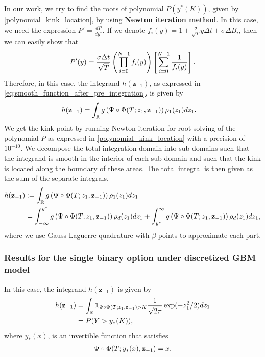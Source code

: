 In our work, we try to  find the roots of polynomial $P(y^{\ast}(K))$, given by \eqref{polynomial_kink_location}, by using \textbf{Newton iteration method}. In this case, we need the expression $P'=\frac{d P}{d y^\ast}$. If we denote $f_i(y)=1+\frac{\sigma}{\sqrt{T}} y \Delta t+ \sigma \Delta B_{i}$, then we can easily show that
\begin{align}\label{polynomial_kink_location_derivative}
	P'(y)=\frac{\sigma \Delta t}{\sqrt{T}} \left( \prod_{i=0}^{N-1} f_i(y)\right) \left[ \sum_{i=0}^{N-1} \frac{1}{f_i(y)}\right].
\end{align}
Therefore, in this case, the integrand $h(\mathbf{z}_{-1})$, as expressed in \eqref{eq:smooth_function_after_pre_integration}, is given by
\begin{align}\label{smoothed_integrand_single_opt_1d}
	h(\mathbf{z}_{-1})&= \int_{\mathbb{R}}  g   \left( \Psi \circ \Phi(T;z_1,\mathbf{z}_{-1})\right)   \rho_1(z_1) dz_1.
\end{align}
We get the kink point by running Newton iteration  for root solving of the polynomial $P$ as expressed in \eqref{polynomial_kink_location} with a precision of $10^{-10}$. We  decompose the total integration domain   into sub-domains such that the integrand is smooth in the interior of each sub-domain  and such that the kink is located along the boundary of these areas. The total integral is then given as the sum of the separate integrals, \ie
\begin{align}
	h(\mathbf{z}_{-1}) &:=  \int_{\mathbb{R}} g \left(\Psi \circ \Phi(T;z_1,\mathbf{z}_{-1})\right)   \rho_1(z_1) dz_1 \nonumber\\
	&=\int_{-\infty}^{y^\ast} g \left( \Psi \circ \Phi(T;z_1,\mathbf{z}_{-1})\right)  \rho_d(z_1) dz_1 +\int_{y^\ast}^{\infty} g \left( \Psi \circ \Phi(T;z_1,\mathbf{z}_{-1})\right) \rho_d(z_1) dz_1,
\end{align}
where we use Gauss-Laguerre quadrature with $\beta$ points to approximate each part.

\subsubsection{Results for the single binary option under discretized GBM model}\label{sec:Results for the binary option example}

In this case, the integrand $h(\mathbf{z}_{-1})$ is given by
\begin{align}\label{smoothed_integrand_binary_opt_2}
	h(\mathbf{z}_{-1})&= \int_{\mathbb{R}} \mathbf{1}_{\Psi \circ \Phi(T;z_1,\mathbf{z}_{-1})>K}\frac{1}{\sqrt{2 \pi}} \operatorname{exp} (-z_1^2/2) dz_1 \nonumber\\
	&=  P(Y>y_{\ast}(K)),
\end{align}
where  $y_{\ast}(x)$, is an invertible function that satisfies 
\begin{align}
	\Psi \circ \Phi (T;y_{\ast}(x),\mathbf{z}_{-1})=x	 .
\end{align}


